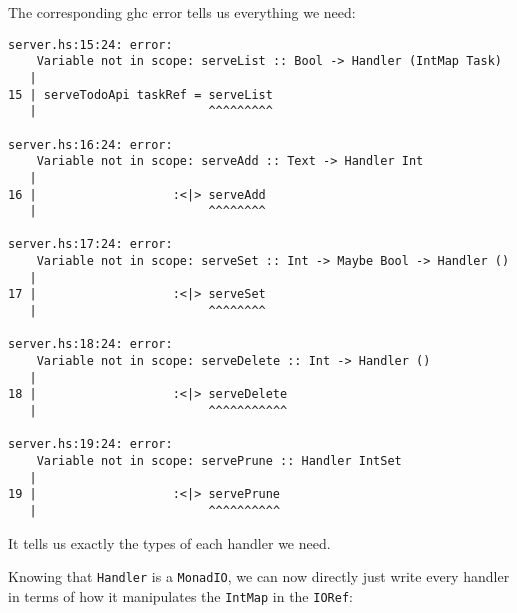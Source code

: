 \documentclass[]{article}
\begin{document}
The corresponding ghc error tells us everything we need:

\begin{verbatim}
server.hs:15:24: error:
    Variable not in scope: serveList :: Bool -> Handler (IntMap Task)
   |
15 | serveTodoApi taskRef = serveList
   |                        ^^^^^^^^^

server.hs:16:24: error:
    Variable not in scope: serveAdd :: Text -> Handler Int
   |
16 |                   :<|> serveAdd
   |                        ^^^^^^^^

server.hs:17:24: error:
    Variable not in scope: serveSet :: Int -> Maybe Bool -> Handler ()
   |
17 |                   :<|> serveSet
   |                        ^^^^^^^^

server.hs:18:24: error:
    Variable not in scope: serveDelete :: Int -> Handler ()
   |
18 |                   :<|> serveDelete
   |                        ^^^^^^^^^^^

server.hs:19:24: error:
    Variable not in scope: servePrune :: Handler IntSet
   |
19 |                   :<|> servePrune
   |                        ^^^^^^^^^^
\end{verbatim}

It tells us exactly the types of each handler we need.

Knowing that \texttt{Handler} is a \texttt{MonadIO}, we can now directly just
write every handler in terms of how it manipulates the \texttt{IntMap} in the
\texttt{IORef}:
\end{document}
